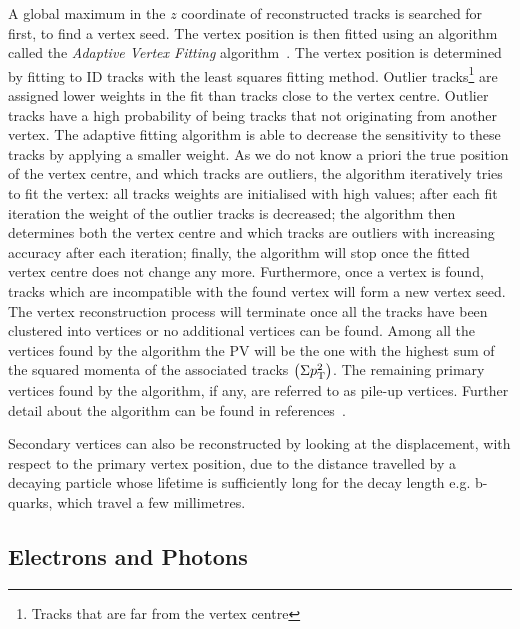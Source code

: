 			A global maximum in the $z$ coordinate of reconstructed tracks is searched for first, to find a vertex seed. The vertex position is then fitted using an algorithm called the \emph{Adaptive Vertex Fitting} algorithm~\cite{ATL-PHYS-PUB-2015-026,Fruhwirth:2007hz}. The vertex position is determined by fitting to \ac{ID} tracks with the least squares fitting method. Outlier tracks\footnote{Tracks that are far from the vertex centre} are assigned lower weights in the fit than tracks close to the vertex centre. Outlier tracks have a high probability of being tracks that not originating from another vertex. 
			The adaptive fitting algorithm is able to decrease the sensitivity to these tracks by applying a smaller weight. As we do not know a priori the true position of the vertex centre, and which tracks are outliers, the algorithm iteratively tries to fit the vertex: all tracks weights are initialised with high values; after each fit iteration the weight of the outlier tracks is decreased; the algorithm then determines both the vertex centre and which tracks are outliers with increasing accuracy after each iteration; finally, the algorithm will stop once the fitted vertex centre does not change any more. Furthermore, once a vertex is found, tracks which are incompatible with the found vertex will form a new vertex seed. The vertex reconstruction process will terminate once all the tracks have been clustered into vertices or no additional vertices can be found. Among all the vertices found by the algorithm the \ac{PV} will be the one with the highest sum of the squared momenta of the associated tracks $\left ( \Sigma p_{\mathrm{T}}^2 \right)$. The remaining primary vertices found by the algorithm, if any, are referred to as pile-up vertices. Further detail about the algorithm can be found in references~\cite{ATL-PHYS-PUB-2015-026,Fruhwirth:2007hz}. 

			Secondary vertices can also be reconstructed by looking at the displacement, with respect to the primary vertex position, due to the distance travelled by a decaying particle whose lifetime is sufficiently long for the decay length e.g. b-quarks, which travel a few millimetres.


		\subsection*{Electrons and Photons}

